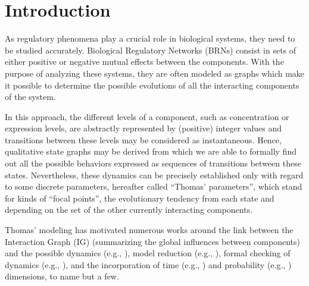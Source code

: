 \section{Introduction}\label{sec:intro}

As regulatory phenomena play a crucial role in biological systems, they need to be studied accurately.
Biological Regulatory Networks (BRNs) consist in sets of either positive or negative mutual effects between the components.
With the purpose of analyzing these systems, they are often modeled as graphs which make it possible to determine the possible evolutions of all the interacting components of the system.

In this approach, the different levels of a component, such as concentration or expression levels, are abstractly represented by (positive) integer values and transitions between these levels may be considered as instantaneous.
Hence, qualitative state graphs may be derived from which we are able to formally find out all the possible behaviors expressed as sequences of transitions between these states.
Nevertheless, these dynamics can be precisely established only with regard to some discrete parameters,
hereafter called ``Thomas' parameters'',
which stand for kinds of ``focal points'', \ie the evolutionary tendency from each state and depending on the set of the other currently interacting components.

Thomas' modeling has motivated numerous works around the link between the Interaction Graph (IG)
(summarizing the global influences between components) and the possible dynamics (e.g.,
\cite{RiCo07,RRT08}),
model reduction (e.g., \cite{Naldi09}), formal checking of dynamics (e.g., \cite{Richard06,Naldi07}), 
and the incorporation of time (e.g., \cite{Siebert06,Ahmad08}) and probability
(e.g., \cite{Twardziok10-CMSB}) dimensions, to name but a few.

